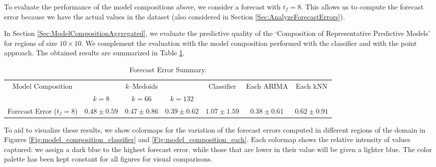 To evaluate the performance of the model compositions above, we consider a forecast with $t_{f} = 8$. This allows us to compute the forecast error because we have the actual values in the dataset (also considered in Section \ref{Sec:AnalyzeForecastErrors}). 

In Section \ref{Sec:ModelCompositionAggregated}, we evaluate the predictive quality of the `Composition of Representative Predictive Models' for regions of size $10 \times 10$. We complement the evaluation with the model composition performed with the classifier and with the point approach. The obtained results are summarized in Table \ref{Table:Query10x10_Classfier_Point_Each_StatSummary}.

\begin{table}[h!]
	\centering
	\tiny
	\begin{tabular}{|c|c|c|c|c|c|c|}
		\hline
		\multirow{2}{*}{Model Composition} & \multicolumn{3}{c|}{$k$--Medoids} & \multirow{2}{*}{Classifier} & \multirow{2}{*}{Each ARIMA} & \multirow{2}{*}{Each kNN} \\
		\cline{2-4}
		& $k = 8$ & $k = 66$ & $k = 132$  \\
		\cline{2-4}
		\hline
		Forecast Error ($t_{f}=8$) & $0.48 \pm 0.59$ & $0.47 \pm 0.86$ & $0.39 \pm 0.62$ & $1.07 \pm 1.59$ & $0.38 \pm 0.61$ & $0.62 \pm 0.91$\\
		\hline
	\end{tabular}
	\caption{Forecast Error Summary.}
	\label{Table:Query10x10_Classfier_Point_Each_StatSummary}
\end{table}

To aid to visualize these results, we show colormaps for the variation of the forecast errors computed in different regions of the domain in Figures \ref{Fig:model_composition_classifier} and \ref{Fig:model_composition_each}. Each colormap shows the relative intensity of values captured: we assign a dark blue to the highest forecast error, while those that are lower in their value will be given a lighter blue. The color palette has been kept constant for all figures for visual comparisons.


